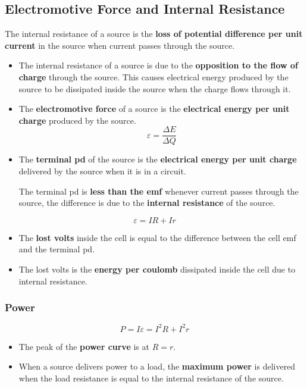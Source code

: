 \subsection{Electromotive Force and Internal Resistance}

The internal resistance of a source is the \textbf{loss of potential difference per unit current} in the source when current passes through the source.
\begin{itemize}
    \item The internal resistance of a source is due to the \textbf{opposition to the flow of charge} through the source. This causes electrical energy produced by the source to be dissipated inside the source when the charge flows through it.
    \item The \textbf{electromotive force} of a source is the \textbf{electrical energy per unit charge} produced by the source.
        $$\varepsilon=\frac{\Delta E}{\Delta Q}$$
    \item The \textbf{terminal pd} of the source is the \textbf{electrical energy per unit charge} delivered by the source when it is in a circuit.

        The terminal pd is \textbf{less than the emf} whenever current passes through the source, the difference is due to the \textbf{internal resistance} of the source.
\end{itemize}
$$\varepsilon=IR+Ir$$

\begin{itemize}
    \item The \textbf{lost volts} inside the cell is equal to the difference between the cell emf and the terminal pd.
    \item The lost volts is the \textbf{energy per coulomb} dissipated inside the cell due to internal resistance.
\end{itemize}

\subsubsection*{Power}
$$P=I\varepsilon=I^2R+I^2r$$

\begin{itemize}
    \item The peak of the \textbf{power curve} is at $R=r$.
    \item When a source delivers power to a load, the \textbf{maximum power} is delivered when the load resistance is equal to the internal resistance of the source.
\end{itemize}

